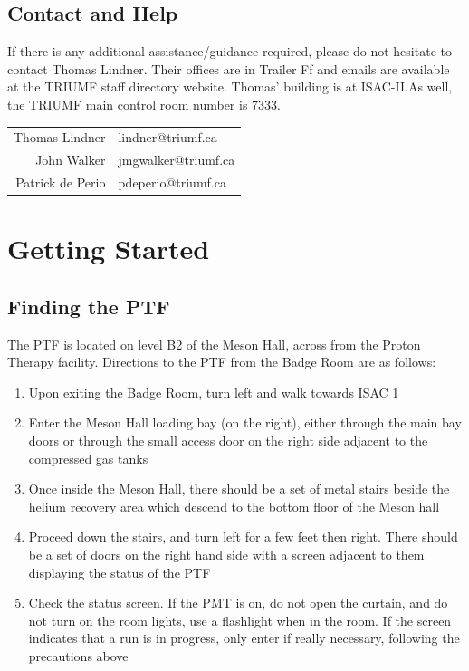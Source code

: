 \documentclass[twoside,letterpaper]{refart}
\begin{document}
\subsection{Contact and Help}

If there is any additional assistance/guidance required, please do not hesitate to contact Thomas Lindner. Their offices are in Trailer Ff and emails are available at the TRIUMF staff directory website. Thomas' building is at ISAC-II.\@ As well, the TRIUMF main control room number is 7333.

\begin{center}\begin{tabular}{rl}
	Thomas Lindner & lindner@triumf.ca \\
	John Walker    & jmgwalker@triumf.ca \\
	Patrick de Perio     & pdeperio@triumf.ca
\end{tabular}\end{center}

\newpage

\section{Getting Started}

\subsection{Finding the PTF}

The PTF is located on level B2 of the Meson Hall, across from the Proton Therapy facility. Directions to the PTF from the Badge Room are as follows:

\begin{enumerate}
	\item Upon exiting the Badge Room, turn left and walk towards ISAC 1
	\item Enter the Meson Hall loading bay (on the right), either through the main bay doors or through the small access door on the right side adjacent to the compressed gas tanks
	\item Once inside the Meson Hall, there should be a set of metal stairs beside the helium recovery area which descend to the bottom floor of the Meson hall
	\item Proceed down the stairs, and turn left for a few feet then right. There should be a set of doors on the right hand side with a screen adjacent to them displaying the status of the PTF
	\item Check the status screen. If the PMT is on, do not open the curtain, and do not turn on the room lights, use a flashlight when in the room. If the screen indicates that a run is in progress, only enter if really necessary, following the precautions above
\end{enumerate}
\end{document}
